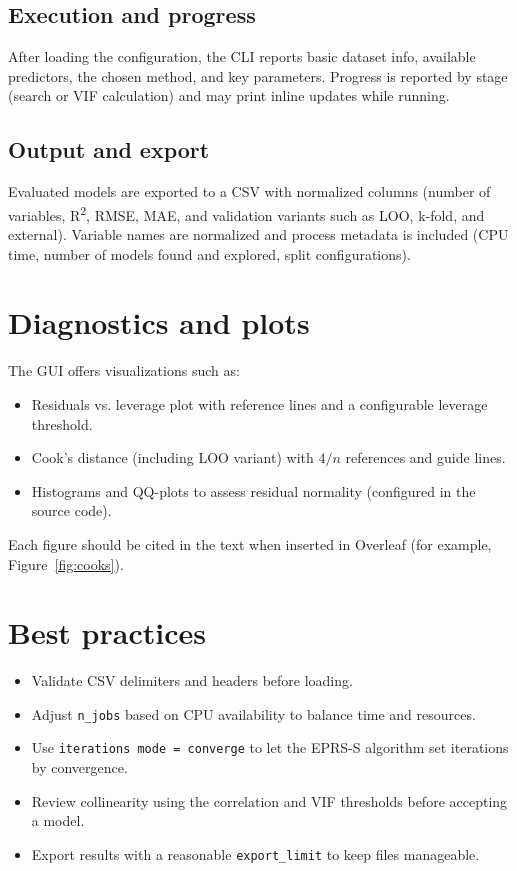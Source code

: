 \documentclass[11pt,a4paper]{article}
\begin{document}
\subsection{Execution and progress}
After loading the configuration, the CLI reports basic dataset info, available predictors, the chosen method, and key parameters. Progress is reported by stage (search or VIF calculation) and may print inline updates while running.\cite{mlrx-source-cli}

\subsection{Output and export}
Evaluated models are exported to a CSV with normalized columns (number of variables, R\textsuperscript{2}, RMSE, MAE, and validation variants such as LOO, k-fold, and external). Variable names are normalized and process metadata is included (CPU time, number of models found and explored, split configurations).\cite{mlrx-source-export}

\section{Diagnostics and plots}
The GUI offers visualizations such as:
\begin{itemize}
  \item Residuals vs. leverage plot with reference lines and a configurable leverage threshold.
  \item Cook's distance (including LOO variant) with \(4/n\) references and guide lines.
  \item Histograms and QQ-plots to assess residual normality (configured in the source code).
\end{itemize}
Each figure should be cited in the text when inserted in Overleaf (for example, Figure~\ref{fig:cooks}).

\section{Best practices}
\begin{itemize}
  \item Validate CSV delimiters and headers before loading.
  \item Adjust \texttt{n\_jobs} based on CPU availability to balance time and resources.
  \item Use \texttt{iterations mode = converge} to let the EPRS-S algorithm set iterations by convergence.
  \item Review collinearity using the correlation and VIF thresholds before accepting a model.
  \item Export results with a reasonable \texttt{export\_limit} to keep files manageable.
\end{itemize}
\end{document}
